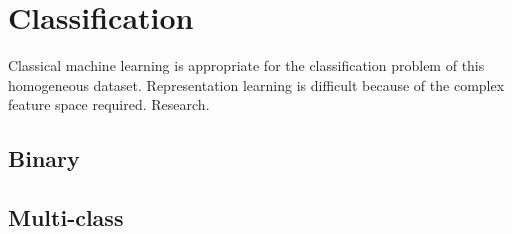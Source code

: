 \section{Classification} \label{sec:meth_Classification}

Classical machine learning is appropriate for the classification problem of this homogeneous dataset. Representation learning is difficult because of the complex feature space required. Research.  

\subsection{Binary}
\subsection{Multi-class}